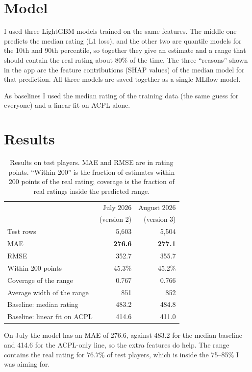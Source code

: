 \documentclass[11pt,a4paper]{article}
\begin{document}
\section{Model}

I used three LightGBM models trained on the same features. The middle one predicts the median
rating (L1 loss), and the other two are quantile models for the 10th and 90th percentile, so
together they give an estimate and a range that should contain the real rating about 80\% of the
time. The three ``reasons'' shown in the app are the feature contributions (SHAP values) of the
median model for that prediction. All three models are saved together as a single MLflow model.

As baselines I used the median rating of the training data (the same guess for everyone) and a
linear fit on ACPL alone.

\section{Results}

\begin{table}[H]
\centering
\caption{Results on test players. MAE and RMSE are in rating points. ``Within 200'' is the
fraction of estimates within 200 points of the real rating; coverage is the fraction of real
ratings inside the predicted range.}
\label{tab:results}
\begin{tabular}{lrr}
\toprule
 & July 2026 & August 2026 \\
 & (version 2) & (version 3) \\
\midrule
Test rows & 5,603 & 5,504 \\
MAE & \textbf{276.6} & \textbf{277.1} \\
RMSE & 352.7 & 355.7 \\
Within 200 points & 45.3\% & 45.2\% \\
Coverage of the range & 0.767 & 0.766 \\
Average width of the range & 851 & 852 \\
\midrule
Baseline: median rating & 483.2 & 484.8 \\
Baseline: linear fit on ACPL & 414.6 & 411.0 \\
\bottomrule
\end{tabular}
\end{table}

On July the model has an MAE of 276.6, against 483.2 for the median baseline and 414.6 for the
ACPL-only line, so the extra features do help. The range contains the real rating for 76.7\% of
test players, which is inside the 75--85\% I was aiming for.
\end{document}
